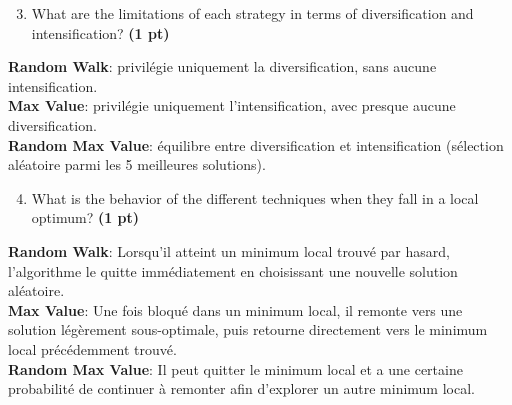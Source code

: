 \documentclass[11pt,a4paper]{report}
\begin{document}
\begin{enumerate}
\setcounter{enumi}{3}
\begin{enumerate}
\setcounter{enumii}{2}
    \item What are the limitations of each strategy in terms of diversification 
    and intensification? \textbf{(1 pt)}
\end{enumerate}
\end{enumerate}

\begin{answers}[5cm]
\textbf{Random Walk}: privilégie uniquement la diversification, sans aucune intensification.\\

\textbf{Max Value}: privilégie uniquement l'intensification, avec presque aucune diversification. \\

\textbf{Random Max Value}:  équilibre entre diversification et intensification (sélection aléatoire parmi les 5 meilleures solutions).\\

\end{answers}

\begin{enumerate}
\setcounter{enumi}{3}
\begin{enumerate}
\setcounter{enumii}{3}
    \item What is the behavior of the different techniques when they fall 
    in a local optimum? \textbf{(1 pt)}
\end{enumerate}
\end{enumerate}
\begin{answers}[5cm]
\textbf{Random Walk}: Lorsqu'il atteint un minimum local trouvé par hasard, l'algorithme le quitte immédiatement en choisissant une nouvelle solution aléatoire.\\


\textbf{Max Value}: Une fois bloqué dans un minimum local, il remonte vers une solution légèrement sous-optimale, puis retourne directement vers le minimum local précédemment trouvé.\\


\textbf{Random Max Value}: Il peut quitter le minimum local et a une certaine probabilité de continuer à remonter afin d’explorer un autre minimum local.\\


\end{answers}
\end{document}

